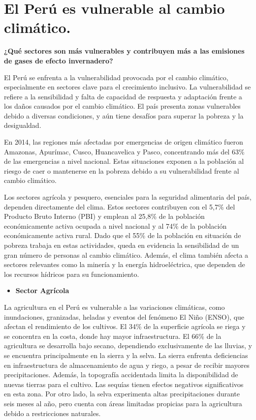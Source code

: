 \documentclass[
  letterpaper,
  DIV=11,
  numbers=noendperiod]{scrartcl}
\providecommand{\tightlist}{%
  \setlength{\itemsep}{0pt}\setlength{\parskip}{0pt}}\usepackage{longtable,booktabs,array}
\begin{document}
\hypertarget{el-peruxfa-es-vulnerable-al-cambio-climuxe1tico.}{%
\section{El Perú es vulnerable al cambio
climático.}\label{el-peruxfa-es-vulnerable-al-cambio-climuxe1tico.}}

\textbf{¿Qué sectores son más vulnerables y contribuyen más a las
emisiones de gases de efecto invernadero?}

El Perú se enfrenta a la vulnerabilidad provocada por el cambio
climático, especialmente en sectores clave para el crecimiento
inclusivo. La vulnerabilidad se refiere a la sensibilidad y falta de
capacidad de respuesta y adaptación frente a los daños causados por el
cambio climático. El país presenta zonas vulnerables debido a diversas
condiciones, y aún tiene desafíos para superar la pobreza y la
desigualdad.

En 2014, las regiones más afectadas por emergencias de origen climático
fueron Amazonas, Apurímac, Cusco, Huancavelica y Pasco, concentrando más
del 63\% de las emergencias a nivel nacional. Estas situaciones exponen
a la población al riesgo de caer o mantenerse en la pobreza debido a su
vulnerabilidad frente al cambio climático.

Los sectores agrícola y pesquero, esenciales para la seguridad
alimentaria del país, dependen directamente del clima. Estos sectores
contribuyen con el 5,7\% del Producto Bruto Interno (PBI) y emplean al
25,8\% de la población económicamente activa ocupada a nivel nacional y
al 74\% de la población económicamente activa rural. Dado que el 55\% de
la población en situación de pobreza trabaja en estas actividades, queda
en evidencia la sensibilidad de un gran número de personas al cambio
climático. Además, el clima también afecta a sectores relevantes como la
minería y la energía hidroeléctrica, que dependen de los recursos
hídricos para su funcionamiento.

\begin{itemize}
\tightlist
\item
  \textbf{Sector Agrícola}
\end{itemize}

La agricultura en el Perú es vulnerable a las variaciones climáticas,
como inundaciones, granizadas, heladas y eventos del fenómeno El Niño
(ENSO), que afectan el rendimiento de los cultivos. El 34\% de la
superficie agrícola se riega y se concentra en la costa, donde hay mayor
infraestructura. El 66\% de la agricultura se desarrolla bajo secano,
dependiendo exclusivamente de las lluvias, y se encuentra principalmente
en la sierra y la selva. La sierra enfrenta deficiencias en
infraestructura de almacenamiento de agua y riego, a pesar de recibir
mayores precipitaciones. Además, la topografía accidentada limita la
disponibilidad de nuevas tierras para el cultivo. Las sequías tienen
efectos negativos significativos en esta zona. Por otro lado, la selva
experimenta altas precipitaciones durante seis meses al año, pero cuenta
con áreas limitadas propicias para la agricultura debido a restricciones
naturales.
\end{document}
